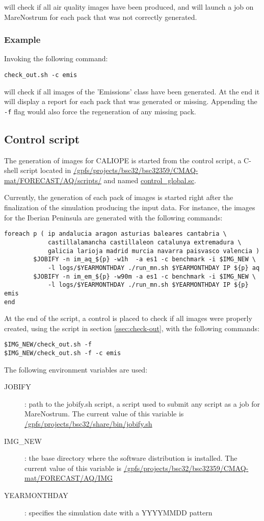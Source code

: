 \documentclass[11pt]{article}
\newcommand{\mn}{MareNostrum}
\begin{document}
will check if all air quality images have been produced, and will launch a job on MareNostrum for each pack that was not correctly generated. 

\subsubsection{Example}
Invoking the following command: 
\begin{verbatim}
check_out.sh -c emis
\end{verbatim}

will check if all images of the 'Emissions' class have been generated. At the end it will display a report for each pack that was generated or missing. Appending the \texttt{-f} flag would also force the regeneration of any missing pack. 

\subsection{Control script}
The generation of images for CALIOPE is started from the control script, a C-shell script located in \url{/gpfs/projects/bsc32/bsc32359/CMAQ-mat/FORECAST/AQ/scripts/} and named \url{control_global.sc}. 

Currently, the generation of each pack of images is started right after the finalization of the simulation producing the input data. For instance, the images for the Iberian Peninsula are generated with the following commands: 
\begin{verbatim}
foreach p ( ip andalucia aragon asturias baleares cantabria \
            castillalamancha castillaleon catalunya extremadura \
            galicia larioja madrid murcia navarra paisvasco valencia )
        $JOBIFY -n im_aq_${p} -w1h  -a es1 -c benchmark -i $IMG_NEW \
            -l logs/$YEARMONTHDAY ./run_mn.sh $YEARMONTHDAY IP ${p} aq
        $JOBIFY -n im_em_${p} -w90m -a es1 -c benchmark -i $IMG_NEW \
            -l logs/$YEARMONTHDAY ./run_mn.sh $YEARMONTHDAY IP ${p} emis
end
\end{verbatim}

At the end of the script, a control is placed to check if all images were properly created, using the script in section \ref{ssec:check-out}, with the following commands: 
\begin{verbatim}
$IMG_NEW/check_out.sh -f
$IMG_NEW/check_out.sh -f -c emis 
\end{verbatim}

The following environment variables are used:
\begin{description}
\item[JOBIFY]: path to the jobify.sh script, a script used to submit any script as a job for \mn{}. The current value of this variable is \url{/gpfs/projects/bsc32/share/bin/jobify.sh}
\item[IMG\_NEW]: the base directory where the software distribution is installed. The current value of this variable is \url{/gpfs/projects/bsc32/bsc32359/CMAQ-mat/FORECAST/AQ/IMG}
\item[YEARMONTHDAY]: specifies the simulation date with a YYYYMMDD pattern
\end{description}
\end{document}
